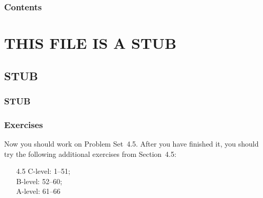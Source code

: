 \documentclass[serif,ignorenonframetext]{beamer}
\title{\commonTitleZeroFourFive}
\subtitle{\commonSubtitleZeroFourFive}
\author{\commonAuthor}
\institute{\commonInstitute}
\date{\commonDateZeroFourFive}
\begin{document}

\begin{frame}
  \titlepage
\end{frame}


\begin{frame}
  \frametitle{Contents}
  \tableofcontents
\end{frame}

\section{THIS FILE IS A STUB}


\subsection{STUB}

\begin{frame}
  \frametitle{STUB}
\end{frame}


\begin{frame}
  \frametitle{Exercises}
  Now you should work on Problem Set~4.5.  After you have finished it,
  you should try the following additional exercises from Section~4.5:
  \begin{itemize}
  \item[4.5]
    C-level: 1--51; \\
    B-level: 52--60; \\
    A-level: 61--66
  \end{itemize}
\end{frame}
\end{document}
